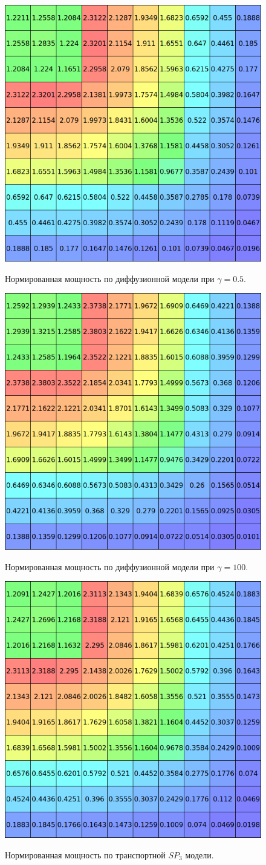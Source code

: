 \documentclass{crm-article}
\begin{document}
\begin{figure}[ht]
\begin{center}
	\includegraphics[width=0.5\linewidth]{dif_pwr.png}\\
	\caption{\label{image:canonsummary} Нормированная мощность по диффузионной модели при $\gamma=0.5$.}
	\label{ris:dif_pwr_0.5}
\end{center}
\end{figure}

\begin{figure}[ht]
\begin{center}
	\includegraphics[width=0.5\linewidth]{dif_pwr_100.png}\\
	\caption{\label{image:canonsummary} Нормированная мощность по диффузионной модели при $\gamma=100$.}
	\label{ris:dif_pwr_100}
\end{center}
\end{figure}

\begin{figure}[ht]
\begin{center}
	\includegraphics[width=0.5\linewidth]{sp3_pwr.png}\\
	\caption{\label{image:canonsummary} Нормированная мощность по транспортной $SP_3$ модели.}
	\label{ris:sp3_pwr}
\end{center}
\end{figure}
\end{document}
